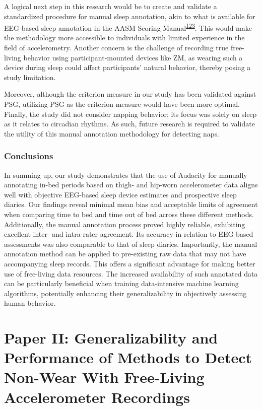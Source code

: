 \documentclass[
  10pt,
]{scrbook}
\begin{document}
A logical next step in this research would be to create and validate a
standardized procedure for manual sleep annotation, akin to what is
available for EEG-based sleep annotation in the AASM Scoring
Manual\textsuperscript{\protect\hyperlink{ref-aasm}{123}}. This would
make the methodology more accessible to individuals with limited
experience in the field of accelerometry. Another concern is the
challenge of recording true free-living behavior using
participant-mounted devices like ZM, as wearing such a device during
sleep could affect participants' natural behavior, thereby posing a
study limitation.

Moreover, although the criterion measure in our study has been validated
against PSG, utilizing PSG as the criterion measure would have been more
optimal. Finally, the study did not consider napping behavior; its focus
was solely on sleep as it relates to circadian rhythms. As such, future
research is required to validate the utility of this manual annotation
methodology for detecting naps.

\hypertarget{conclusions}{%
\subsection{Conclusions}\label{conclusions}}

In summing up, our study demonstrates that the use of Audacity for
manually annotating in-bed periods based on thigh- and hip-worn
accelerometer data aligns well with objective EEG-based sleep device
estimates and prospective sleep diaries. Our findings reveal minimal
mean bias and acceptable limits of agreement when comparing time to bed
and time out of bed across these different methods. Additionally, the
manual annotation process proved highly reliable, exhibiting excellent
inter- and intra-rater agreement. Its accuracy in relation to EEG-based
assessments was also comparable to that of sleep diaries. Importantly,
the manual annotation method can be applied to pre-existing raw data
that may not have accompanying sleep records. This offers a significant
advantage for making better use of free-living data resources. The
increased availability of such annotated data can be particularly
beneficial when training data-intensive machine learning algorithms,
potentially enhancing their generalizability in objectively assessing
human behavior.

\newpage

\hypertarget{paper-ii-generalizability-and-performance-of-methods-to-detect-non-wear-with-free-living-accelerometer-recordings}{%
\chapter{Paper II: Generalizability and Performance of Methods to Detect
Non-Wear With Free-Living Accelerometer
Recordings}\label{paper-ii-generalizability-and-performance-of-methods-to-detect-non-wear-with-free-living-accelerometer-recordings}}
\end{document}
